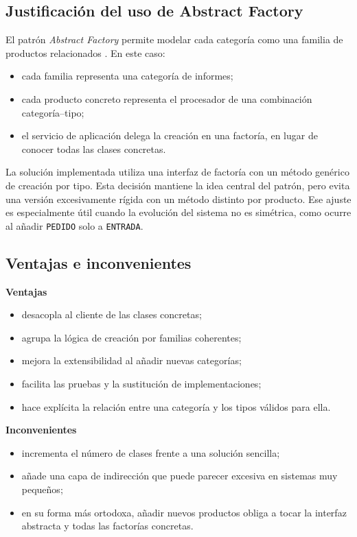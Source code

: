 \documentclass[12pt]{article}
\begin{document}
\subsection{Justificación del uso de Abstract Factory}
El patrón \emph{Abstract Factory} permite modelar cada categoría como una familia de productos relacionados \cite{gamma1994design}. En este caso:

\begin{itemize}[leftmargin=*]
  \item cada familia representa una categoría de informes;
  \item cada producto concreto representa el procesador de una combinación categoría--tipo;
  \item el servicio de aplicación delega la creación en una factoría, en lugar de conocer todas las clases concretas.
\end{itemize}

La solución implementada utiliza una interfaz de factoría con un método genérico de creación por tipo. Esta decisión mantiene la idea central del patrón, pero evita una versión excesivamente rígida con un método distinto por producto. Ese ajuste es especialmente útil cuando la evolución del sistema no es simétrica, como ocurre al añadir \texttt{PEDIDO} solo a \texttt{ENTRADA}.

\subsection{Ventajas e inconvenientes}
\textbf{Ventajas}

\begin{itemize}[leftmargin=*]
  \item desacopla al cliente de las clases concretas;
  \item agrupa la lógica de creación por familias coherentes;
  \item mejora la extensibilidad al añadir nuevas categorías;
  \item facilita las pruebas y la sustitución de implementaciones;
  \item hace explícita la relación entre una categoría y los tipos válidos para ella.
\end{itemize}

\textbf{Inconvenientes}

\begin{itemize}[leftmargin=*]
  \item incrementa el número de clases frente a una solución sencilla;
  \item añade una capa de indirección que puede parecer excesiva en sistemas muy pequeños;
  \item en su forma más ortodoxa, añadir nuevos productos obliga a tocar la interfaz abstracta y todas las factorías concretas.
\end{itemize}
\end{document}
